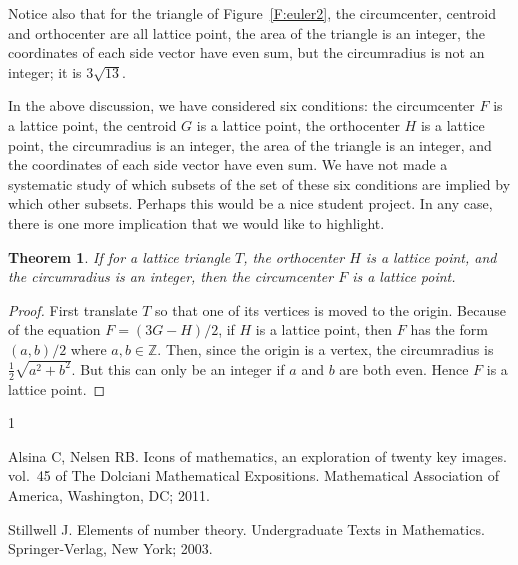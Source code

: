 \documentclass[10pt,preprint]{amsart}
\def\Z{\mathbb Z}
\theoremstyle{plain}
\newtheorem{theorem}{Theorem}
\theoremstyle{definition}
\theoremstyle{remark}
\begin{document}
Notice also that for the triangle of Figure~\ref{F:euler2}, the circumcenter, centroid and orthocenter are all lattice point,  the area of the triangle is an integer,
 the coordinates of each side vector  have even sum, but the circumradius is not an integer; it is $3\sqrt{13}$. 

In the above discussion, we have considered six conditions: the circumcenter $F$ is a lattice point, the centroid $G$ is a lattice point, the orthocenter $H$ is a lattice point, the circumradius is an integer, the area of the triangle is an integer, and the coordinates of each side vector  have even sum.  We have not made a systematic study of which subsets of the set of these six conditions are implied by which other subsets. Perhaps this would be a nice student project. In any case, there is one more implication that we would like to highlight.

\begin{theorem}
If for a lattice triangle $T$,  the orthocenter $H$ is a lattice point, and the circumradius is an integer, then the circumcenter $F$ is a lattice point.  \end{theorem}

\begin{proof} 
First translate $T$ so that one of its vertices is moved to the origin. Because of the equation $ F=(3G-H)/2$,  if $H$ is a lattice point, then $F$ has the form $(a,b)/2$ where $a,b\in \Z$. Then,  since the origin is a vertex, the circumradius is $\frac12 \sqrt{a^2+b^2}$. But this can only be an integer if $a$ and $b$ are both even. Hence $F$ is a lattice point. 
\end{proof} 






\begin{thebibliography}{1}

Alsina C, Nelsen RB.
\newblock Icons of mathematics, an exploration of twenty key images. vol.~45 of The Dolciani Mathematical
  Expositions.
\newblock Mathematical Association of America, Washington, DC; 2011.

Stillwell J.
\newblock Elements of number theory.
\newblock Undergraduate Texts in Mathematics. Springer-Verlag, New York; 2003.

\end{thebibliography}
\end{document}
